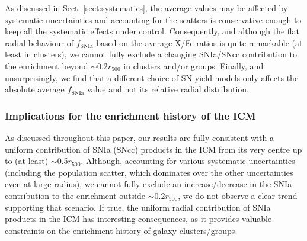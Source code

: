 \documentclass{aa}
\begin{document}
As discussed in Sect. \ref{sect:systematics}, the average values may be affected by systematic uncertainties and accounting for the scatters is conservative enough to keep all the systematic effects under control. Consequently, and although the flat radial behaviour of $f_\text{SNIa}$ based on the average X/Fe ratios is quite remarkable (at least in clusters), we cannot fully exclude a changing SNIa/SNcc contribution to the enrichment beyond $\sim$0.2$r_{500}$ in clusters and/or groups. Finally, and unsurprisingly, we find that a different choice of SN yield models only affects the absolute average $f_\text{SNIa}$ value and not its relative radial distribution.







\subsubsection*{Implications for the enrichment history of the ICM}

As discussed throughout this paper, our results are fully consistent with a uniform contribution of SNIa (SNcc) products in the ICM from its very centre up to (at least) $\sim$0.5$r_{500}$. Although, accounting for various systematic uncertainties (including the population scatter, which dominates over the other uncertainties even at large radius), we cannot fully exclude an increase/decrease in the SNIa contribution to the enrichment outside $\sim$0.2$r_{500}$, we do not observe a clear trend supporting that scenario. If true, the uniform radial contribution of SNIa products in the ICM has interesting consequences, as it provides valuable constraints on the enrichment history of galaxy clusters/groups.
\end{document}
